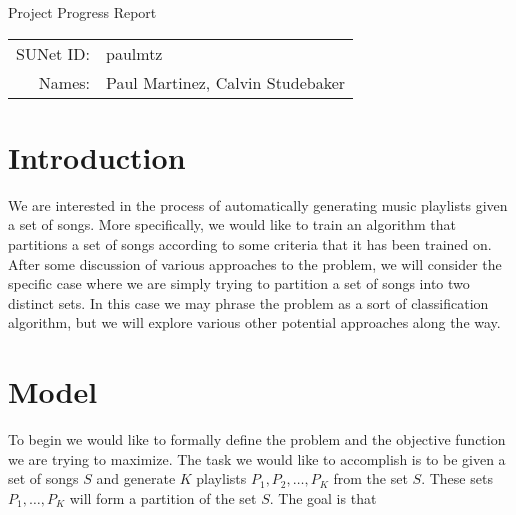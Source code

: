 \documentclass[10pt]{article}
\begin{document}
\begin{center}
{\Large Project Progress Report}

\begin{tabular}{rl}
SUNet ID: & paulmtz \\
Names: & Paul Martinez, Calvin Studebaker \\
\end{tabular}
\end{center}

\section*{Introduction}

We are interested in the process of automatically generating music playlists given a set of songs. More specifically, we would like to train an algorithm that partitions a set of songs according to some criteria that it has been trained on. After some discussion of various approaches to the problem, we will consider the specific case where we are simply trying to partition a set of songs into two distinct sets. In this case we may phrase the problem as a sort of classification algorithm, but we will explore various other potential approaches along the way.

\section*{Model}

To begin we would like to formally define the problem and the objective function we are trying to maximize. The task we would like to accomplish is to be given a set of songs $S$ and generate $K$ playlists $P_1, P_2, \ldots, P_K$ from the set $S$. These sets $P_1, \ldots, P_K$ will form a partition of the set $S$. The goal is that 
\end{document}
